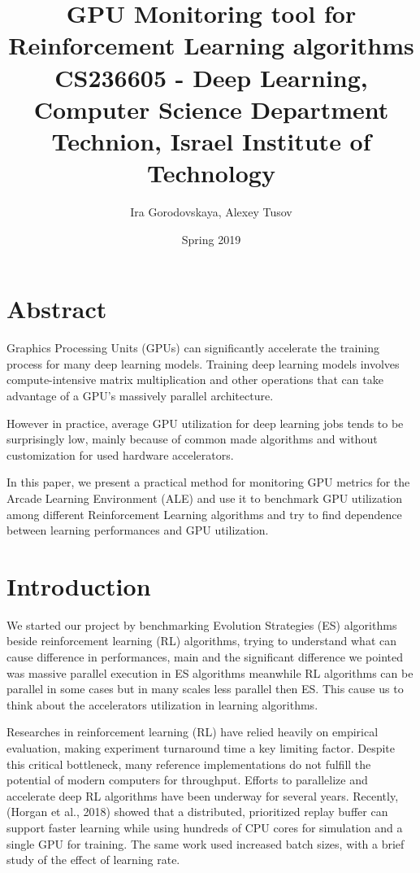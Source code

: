 \documentclass[11 pt, twocolumn]{article}
\title{\textbf{GPU Monitoring tool for Reinforcement Learning algorithms}\\\Large CS236605 - Deep Learning, Computer Science Department\\Technion, Israel Institute of Technology}
\author{Ira Gorodovskaya, Alexey Tusov}
\date{Spring 2019}
\begin{document}
\maketitle
\section{Abstract}
Graphics Processing Units (GPUs) can significantly accelerate the training process for many deep learning models. Training deep learning models involves compute-intensive matrix multiplication and other operations that can take advantage of a GPU's massively parallel architecture.

However in practice, average GPU utilization for deep learning jobs tends to be surprisingly low, mainly because of common made algorithms and without customization for used hardware accelerators.

In this paper, we present a practical method for monitoring GPU metrics for the Arcade Learning Environment (ALE) and use it to benchmark GPU utilization among different Reinforcement Learning algorithms and try to find dependence between learning performances and GPU utilization.


\section{Introduction}
We started our project by benchmarking Evolution Strategies (ES) algorithms beside reinforcement learning (RL) algorithms, trying to understand what can cause difference in performances, main and the significant difference we pointed was massive parallel execution in ES algorithms meanwhile RL algorithms can be parallel in some cases but in many scales less parallel then ES. This cause us to think about the accelerators utilization in learning algorithms.


Researches in reinforcement learning (RL) have relied heavily on empirical evaluation, making experiment turnaround time a key limiting factor. Despite this critical bottleneck, many reference implementations do not fulfill
the potential of modern computers for throughput.
Efforts to parallelize and accelerate deep RL algorithms have been underway for several years. Recently, (Horgan et al., 2018\cite{horgan2018distributed}) showed that a distributed, prioritized replay buffer can support faster
learning while using hundreds of CPU cores for simulation and a single GPU for training. The same work used increased batch sizes, with a brief study of the effect of
learning rate.
\end{document}
